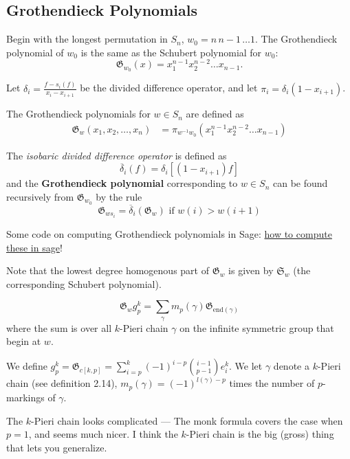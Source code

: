 \documentclass[11pt]{article}
\begin{document}
\subsection{Grothendieck Polynomials}

Begin with the longest permutation in $S_n$, $w_0 = n \, n-1 \, \dots 1$. The Grothendieck polynomial of $w_0$ is the same as the Schubert polynomial for $w_0$:
\[
    \mathfrak{G}_{w_0}(x) = x_1^{n-1} x_2^{n-2} \dots x_{n-1}.
\]
\begin{definition}
Let $\delta_i = \frac{f - s_i(f)}{x_i - x_{i+1}}$ be the divided difference operator, and let $\pi_i = \delta_i(1-x_{i+1})$. 

The Grothendieck polynomials for $w \in S_n$ are defined as
\begin{align*}
    \mathfrak{G}_w(x_1, x_2, \ldots, x_n) &= \pi_{w^{-1}w_0}(x_1^{n-1} x_2^{n-2} \ldots x_{n-1}) 
\end{align*}
\end{definition}


\begin{definition}
The \textit{isobaric divided difference operator} is defined as
\[
    \overline{\delta}_i(f) = \delta_i[(1-x_{i+1})f]
\] 
and the \textbf{Grothendieck polynomial} corresponding to $w \in S_n$ can be found recursively from $\mathfrak{G}_{w_0}$ by the rule
\[
    \mathfrak{G}_{ws_i} = \overline{\delta}_i(\mathfrak{G}_w) \text{ if $w(i) > w(i+1)$}
\]
\end{definition}

Some code on computing Grothendieck polynomials in Sage: \href{https://wiki.sagemath.org/combinat/MultivariatePolynomials}{how to compute these in sage}!

Note that the lowest degree homogenous part of $\mathfrak{G}_w$ is given by $\mathfrak{S}_w$ (the corresponding Schubert polynomial). 

\begin{theorem}
    \begin{equation*}
        \mathfrak{G}_wg_p^k = \sum_\gamma m_p(\gamma) \mathfrak{G}_{\text{end}(\gamma)}
    \end{equation*} 
    where the sum is over all $k$-Pieri chain $\gamma$ on the infinite symmetric group that begin at $w$.

    We define $g_p^k = \mathfrak{G}_{c[k,p]} = \sum_{i=p}^k (-1)^{i-p} {{i-1}\choose{p-1}} e_i^k$. We let $\gamma$ denote a $k$-Pieri chain (see definition 2.14), $m_p(\gamma) = (-1)^{l(\gamma) -p}$ times the number of $p$-markings of $\gamma$.
\end{theorem}
The $k$-Pieri chain looks complicated — The monk formula covers the case when $p = 1$, and seems much nicer. I think the $k$-Pieri chain is the big (gross) thing that lets you generalize.
\end{document}
